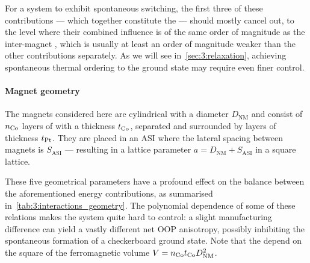 For a system to exhibit spontaneous switching, the first three of these contributions --- which together constitute the  --- should mostly cancel out, to the level where their combined influence is of the same order of magnitude as the inter-magnet , which is usually at least an order of magnitude weaker than the other contributions separately.
As we will see in~\cref{sec:3:relaxation}, achieving spontaneous thermal ordering to the ground state may require even finer control.

\paragraph{Magnet geometry}\label{sec:3:OOP_geometry}
The magnets considered here are cylindrical with a diameter $D_\mathrm{NM}$ and consist of $n_{\ce{Co}}$ layers of  with a thickness $t_{\ce{Co}}$, separated and surrounded by  layers of thickness $t_{\ce{Pt}}$.
They are placed in an ASI where the lateral spacing between magnets is $S_\mathrm{ASI}$ --- resulting in a lattice parameter $a=D_\mathrm{NM}+S_\mathrm{ASI}$ in a square lattice. \par
These five geometrical parameters have a profound effect on the balance between the aforementioned energy contributions, as summarised in~\cref{tab:3:interactions_geometry}.
The polynomial dependence of some of these relations makes the system quite hard to control: a slight manufacturing difference can yield a vastly different net OOP anisotropy, possibly inhibiting the spontaneous formation of a checkerboard ground state.
Note that the  depend on the square of the ferromagnetic volume $V=n_{\ce{Co}} t_{\ce{Co}} D_\mathrm{NM}^2$.

\vspace{-1em}

